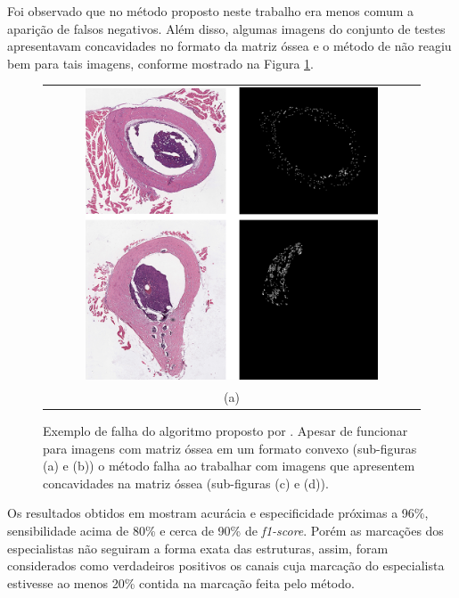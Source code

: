 Foi observado que no método proposto neste trabalho era menos comum a aparição de falsos negativos. Além disso, algumas imagens do conjunto de testes apresentavam concavidades no formato da matriz óssea e o método de \cite{gondim2021automatic} não reagiu bem para tais imagens, conforme mostrado na Figura \ref{fig:gondim-bad-prediction}.

\begin{figure}[H]
    \centering
    
    \begin{tabular}{c}
        \includegraphics[width=0.8\textwidth]{figures/4_results/falha-gondim_lower_res.png} \\[\abovecaptionskip]
    \small (a) 
    \end{tabular}

    \caption[Exemplo de falha do algoritmo proposto por \cite{gondim2021automatic}.]{Exemplo de falha do algoritmo proposto por \cite{gondim2021automatic}. Apesar de funcionar para imagens com matriz óssea em um formato convexo (sub-figuras (a) e (b)) o método falha ao trabalhar com imagens que apresentem concavidades na matriz óssea (sub-figuras (c) e (d)).}
    \label{fig:gondim-bad-prediction}
\end{figure}

Os resultados obtidos em \cite{gondim2021automatic} mostram acurácia e especificidade próximas a 96\%, sensibilidade acima de 80\% e cerca de 90\% de \textit{f1-score}. Porém as marcações dos especialistas não seguiram a forma exata das estruturas, assim, foram considerados como verdadeiros positivos os canais cuja marcação do especialista estivesse ao menos 20\% contida na marcação feita pelo método. 

